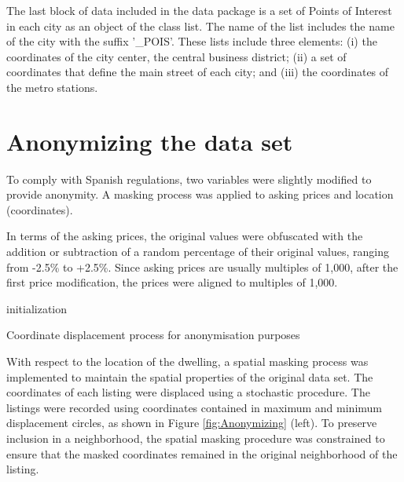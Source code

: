 \documentclass[Royal,times,sageh]{sagej}
\begin{document}
The last block of data included in the data package is a set of Points
of Interest in each city as an object of the class list. The name of the
list includes the name of the city with the suffix '\_POIS'. These lists
include three elements: (i) the coordinates of the city center, the
central business district; (ii) a set of coordinates that define the
main street of each city; and (iii) the coordinates of the metro
stations.

\hypertarget{anonymizing}{%
\section{Anonymizing the data set}\label{anonymizing}}

To comply with Spanish regulations, two variables were slightly modified
to provide anonymity. A masking process was applied to asking prices and
location (coordinates).

In terms of the asking prices, the original values were obfuscated with
the addition or subtraction of a random percentage of their original
values, ranging from -2.5\% to +2.5\%. Since asking prices are usually
multiples of 1,000, after the first price modification, the prices were
aligned to multiples of 1,000.

\begin{algorithm}[!ht]
 initialization\;
 \caption{Coordinate displacement process for anonymisation purposes}
 \label{algo:coordinates-displacement}
\end{algorithm}

With respect to the location of the dwelling, a spatial masking process
was implemented to maintain the spatial properties of the original data
set. The coordinates of each listing were displaced using a stochastic
procedure. The listings were recorded using coordinates contained in
maximum and minimum displacement circles, as shown in Figure
\ref{fig:Anonymizing} (left). To preserve inclusion in a neighborhood,
the spatial masking procedure was constrained to ensure that the masked
coordinates remained in the original neighborhood of the listing.
\end{document}
